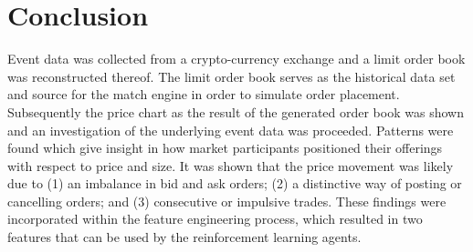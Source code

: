 \section{Conclusion}

Event data was collected from a crypto-currency exchange and a limit order book was reconstructed thereof.
The limit order book serves as the historical data set and source for the match engine in order to simulate order placement. 
Subsequently the price chart as the result of the generated order book was shown and an investigation of the underlying event data was proceeded.
Patterns were found which give insight in how market participants positioned their offerings with respect to price and size.
It was shown that the price movement was likely due to (1) an imbalance in bid and ask orders; (2) a distinctive way of posting or cancelling orders; and (3) consecutive or impulsive trades.
These findings were incorporated within the feature engineering process, which resulted in two features that can be used by the reinforcement learning agents.